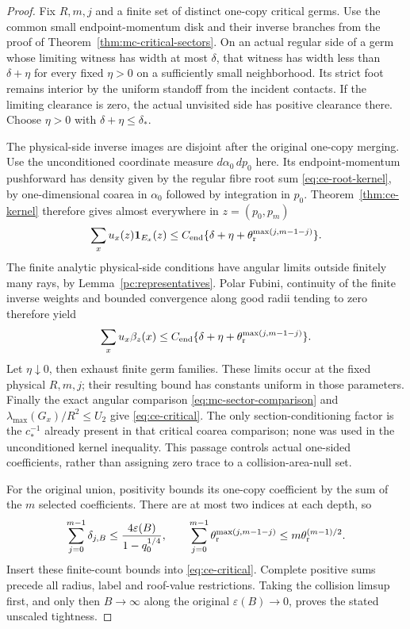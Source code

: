 \begin{proof}
Fix $R,m,j$ and a finite set of distinct one-copy critical
germs.  Use the common small endpoint-momentum disk and
their inverse branches from the proof of
Theorem~\ref{thm:mc-critical-sectors}.  On an actual
regular side of a germ whose limiting witness has width
at most $\delta$, that witness has width less than
$\delta+\eta$ for every fixed $\eta>0$ on a sufficiently
small neighborhood.  Its strict foot remains interior by
the uniform standoff from the incident contacts.  If the
limiting clearance is zero, the actual unvisited side has
positive clearance there.  Choose
$\eta>0$ with $\delta+\eta\le\delta_*$.

The physical-side inverse images are disjoint after the
original one-copy merging.  Use the unconditioned
coordinate measure $d\alpha_0\,dp_0$ here.  Its
endpoint-momentum pushforward has density given by the
regular fibre root sum \eqref{eq:ce-root-kernel}, by
one-dimensional coarea in $\alpha_0$ followed by
integration in $p_0$.  Theorem~\ref{thm:ce-kernel}
therefore gives almost everywhere in $z=(p_0,p_m)$
\[
 \sum_xu_x(z)\mathbf1_{E_x}(z)
     \le C_{\rm end}
        \{\delta+\eta+\theta_{\rm r}^{\max(j,m-1-j)}\}.
\]
The finite analytic physical-side conditions have angular
limits outside finitely many rays, by
Lemma~\ref{pc:representatives}.  Polar Fubini, continuity of
the finite inverse weights and bounded convergence along
good radii tending to zero therefore yield
\[
 \sum_xu_x\beta_z(x)
     \le C_{\rm end}
        \{\delta+\eta+\theta_{\rm r}^{\max(j,m-1-j)}\}.
\]
Let $\eta\downarrow0$, then exhaust finite germ families.
These limits occur at the fixed physical $R,m,j$;
their resulting bound has constants uniform in those
parameters.  Finally the exact angular comparison
\eqref{eq:mc-sector-comparison} and
$\lambda_{\max}(G_x)/R^2\le U_2$ give
\eqref{eq:ce-critical}.  The only section-conditioning
factor is the $c_*^{-1}$ already present in that critical
coarea comparison; none was used in the unconditioned
kernel inequality.  This passage controls actual
one-sided coefficients, rather than assigning zero trace
to a collision-area-null set.

For the original union, positivity bounds its one-copy
coefficient by the sum of the $m$ selected coefficients.
There are at most two indices at each depth, so
\[
 \sum_{j=0}^{m-1}\delta_{j,B}
       \le\frac{4\varepsilon(B)}{1-q_0^{1/4}},\qquad
 \sum_{j=0}^{m-1}\theta_{\rm r}^{\max(j,m-1-j)}
       \le m\theta_{\rm r}^{(m-1)/2}.
\]
Insert these finite-count bounds into
\eqref{eq:ce-critical}.  Complete positive sums precede all
radius, label and roof-value restrictions.  Taking the
collision limsup first, and only then $B\to\infty$ along
the original $\varepsilon(B)\to0$, proves the stated
unscaled tightness.
\end{proof}

